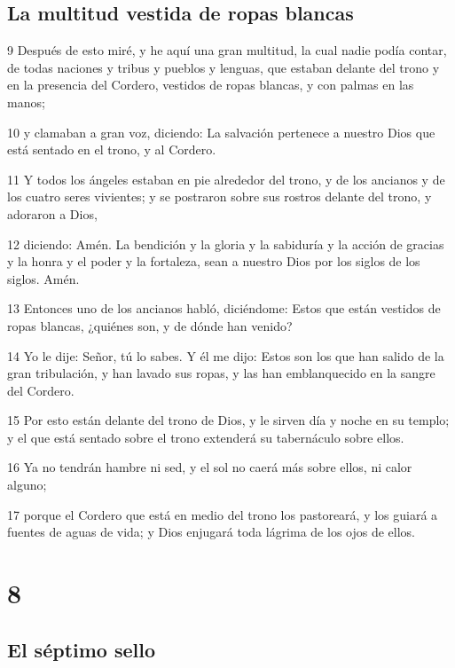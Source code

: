 \section*{La multitud vestida de ropas blancas}

\par 9 Después de esto miré, y he aquí una gran multitud, la cual nadie podía contar, de todas naciones y tribus y pueblos y lenguas, que estaban delante del trono y en la presencia del Cordero, vestidos de ropas blancas, y con palmas en las manos;
\par 10 y clamaban a gran voz, diciendo: La salvación pertenece a nuestro Dios que está sentado en el trono, y al Cordero.
\par 11 Y todos los ángeles estaban en pie alrededor del trono, y de los ancianos y de los cuatro seres vivientes; y se postraron sobre sus rostros delante del trono, y adoraron a Dios,
\par 12 diciendo: Amén. La bendición y la gloria y la sabiduría y la acción de gracias y la honra y el poder y la fortaleza, sean a nuestro Dios por los siglos de los siglos. Amén.
\par 13 Entonces uno de los ancianos habló, diciéndome: Estos que están vestidos de ropas blancas, ¿quiénes son, y de dónde han venido?
\par 14 Yo le dije: Señor, tú lo sabes. Y él me dijo: Estos son los que han salido de la gran tribulación, y han lavado sus ropas, y las han emblanquecido en la sangre del Cordero.
\par 15 Por esto están delante del trono de Dios, y le sirven día y noche en su templo; y el que está sentado sobre el trono extenderá su tabernáculo sobre ellos.
\par 16 Ya no tendrán hambre ni sed, y el sol no caerá más sobre ellos, ni calor alguno;
\par 17 porque el Cordero que está en medio del trono los pastoreará, y los guiará a fuentes de aguas de vida; y Dios enjugará toda lágrima de los ojos de ellos.

\chapter{8}

\section*{El séptimo sello}

